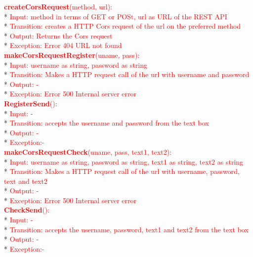 \documentclass[12,english]{article}
\begin{document}
			\textcolor{red}{\textbf{createCorsRequest}(method, url):} \\*
			\textcolor{red}{Input: method in terms of GET or POSt, url as URL of the REST API} \\*
			\textcolor{red}{Transition: creates a HTTP Cors request of the url on the preferred method} \\*
			\textcolor{red}{ Output: Returns the Cors request } \\*
			\textcolor{red}{Exception: Error 404 URL not found } 
			\\
			
			\textcolor{red}{\textbf{makeCorsRequestRegister}(uname, pass):} \\*
			\textcolor{red}{Input: username as string, password as string} \\*
			\textcolor{red}{Transition: Makes a HTTP request call of the url with username and password} \\*
			\textcolor{red}{ Output: - } \\*
			\textcolor{red}{Exception: Error 500 Internal server error } 
			\\
			
			\textcolor{red}{\textbf{RegisterSend}():} \\*
			\textcolor{red}{Input: -} \\*
			\textcolor{red}{Transition: accepts the username and password from the text box} \\*
			\textcolor{red}{ Output: - } \\*
			\textcolor{red}{Exception:-  } 
			\\
			
			\textcolor{red}{\textbf{makeCorsRequestCheck}(uname, pass, text1, text2):} \\*
			\textcolor{red}{Input: username as string, password as string, text1 as string, text2 as string} \\*
			\textcolor{red}{Transition: Makes a HTTP request call of the url with username, password, text and text2} \\*
			\textcolor{red}{ Output: - } \\*
			\textcolor{red}{Exception: Error 500 Internal server error } 
			\\
			
			\textcolor{red}{\textbf{CheckSend}():} \\*
			\textcolor{red}{Input: -} \\*
			\textcolor{red}{Transition: accepts the username, password, text1 and text2 from the text box} \\*
			\textcolor{red}{ Output: - } \\*
			\textcolor{red}{Exception:-  } 
			\\
			
\end{document}

